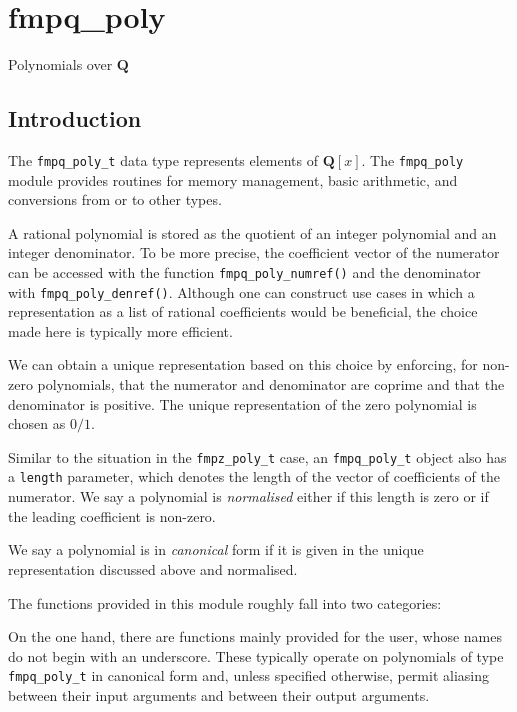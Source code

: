 \documentclass[a4paper,10pt]{book}
\newcommand{\Q}{\mathbf{Q}}%
\newcommand{\code}{\lstinline}
\begin{document}

\chapter{fmpq\_poly}
\epigraph{Polynomials over $\Q$}{}

\section{Introduction}

The \code{fmpq_poly_t} data type represents elements of $\Q[x]$. The 
\code{fmpq_poly} module provides routines for memory management, basic 
arithmetic, and conversions from or to other types.

A rational polynomial is stored as the quotient of an integer polynomial 
and an integer denominator.  To be more precise, the coefficient vector 
of the numerator can be accessed with the function \code{fmpq_poly_numref()} 
and the denominator with \code{fmpq_poly_denref()}.  Although one can 
construct use cases in which a representation as a list of rational 
coefficients would be beneficial, the choice made here is typically 
more efficient.

We can obtain a unique representation based on this choice by enforcing, 
for non-zero polynomials, that the numerator and denominator are coprime 
and that the denominator is positive.  The unique representation of the 
zero polynomial is chosen as $0/1$.

Similar to the situation in the \code{fmpz_poly_t} case, an 
\code{fmpq_poly_t} object also has a \code{length} parameter, which 
denotes the length of the vector of coefficients of the numerator. 
We say a polynomial is \emph{normalised} either if this length is zero 
or if the leading coefficient is non-zero.

We say a polynomial is in \emph{canonical} form if it is given in the 
unique representation discussed above and normalised.

The functions provided in this module roughly fall into two categories:

On the one hand, there are functions mainly provided for the user, whose 
names do not begin with an underscore.  These typically operate on 
polynomials of type \code{fmpq_poly_t} in canonical form and, unless 
specified otherwise, permit aliasing between their input arguments and 
between their output arguments.
\end{document}
